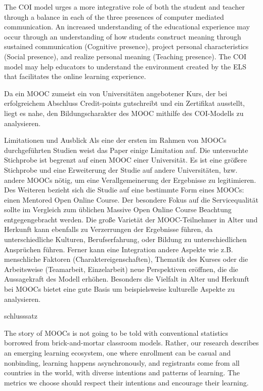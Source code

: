 The COI model urges a more integrative role of both the student and teacher through a balance in each of the three presences of computer mediated communication. An increased understanding of the educational experience may occur through an understanding of how students construct meaning through sustained communication (Cognitive presence), project personal characteristics (Social presence), and realize personal meaning (Teaching presence). The COI model may help educators to understand the environment created by the ELS that facilitates the online learning experience.

Da ein MOOC zumeist ein von Universitäten angebotener Kurs, der bei erfolgreichem Abschluss Credit-points gutschreibt und ein Zertifikat ausstellt, liegt es nahe, den Bildungscharakter des MOOC mithilfe des COI-Modells zu analysieren.     

Limitationen und Ausblick
Als eine der ersten im Rahmen von MOOCs durchgeführten Studien weist das Paper einige Limitation auf. Die untersuchte Stichprobe ist begrenzt auf einen MOOC einer Universität. Es ist eine größere Stichprobe und eine Erweiterung der Studie auf andere Universitäten, bzw. andere MOOCs nötig, um eine Verallgemeinerung der Ergebnisse zu legitimieren. Des Weiteren bezieht sich die Studie auf eine bestimmte Form eines MOOCs: einen Mentored Open Online Course. Der besondere Fokus auf die Servicequalität sollte im Vergleich zum üblichen Massive Open Online Course Beachtung entgegengebracht werden. Die große Varietät der MOOC-Teilnehmer in Alter und Herkunft kann ebenfalls zu Verzerrungen der Ergebnisse führen, da unterschiedliche Kulturen, Berufserfahrung, oder Bildung zu unterschiedlichen Ansprüchen führen. 
Ferner kann eine Integration andere Aspekte wie z.B. menschliche Faktoren (Charaktereigenschaften), Thematik des Kurses oder die Arbeitsweise (Teamarbeit, Einzelarbeit) neue Perspektiven eröffnen, die die Aussagekraft des Modell erhöhen. Besonders die Vielfalt in Alter und Herkunft bei MOOCs bietet eine gute Basis um beispielsweise kulturelle Aspekte zu analysieren.  

schlusssatz

 

The story of MOOCs is not going to be told with conventional statistics borrowed from brick-and-mortar classroom models. Rather, our research describes an emerging learning ecosystem, one where enrollment can be casual and nonbinding, learning happens asynchronously, and registrants come from all countries in the world, with diverse intentions and patterns of learning. The metrics we choose should respect their intentions and encourage their learning.\parencite{reich2014tricky}


